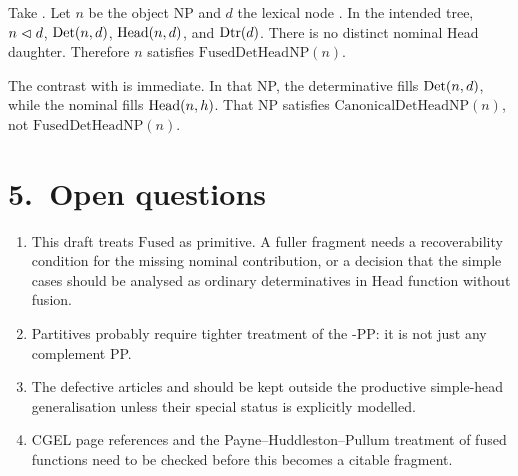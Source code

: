 \documentclass[11pt]{article}
\newcommand{\Dtr}{\Cat{Dtr}}
\newcommand{\Fused}{\mathrm{Fused}}
\newcommand{\FusedDetHeadNP}{\mathrm{FusedDetHeadNP}}
\newcommand{\CanonicalDetHeadNP}{\mathrm{CanonicalDetHeadNP}}
\begin{document}
Take . Let $n$ be the object NP and $d$ the lexical
node . In the intended tree, $n \mathrel{\lhd} d$, $\mathrm{Det}(n,d)$,
$\mathrm{Head}(n,d)$, and $\Dtr(d)$. There is no distinct nominal Head daughter.
Therefore $n$ satisfies $\FusedDetHeadNP(n)$.

The contrast with  is immediate. In that NP, the
determinative  fills $\mathrm{Det}(n,d)$, while the nominal
 fills $\mathrm{Head}(n,h)$. That NP satisfies
$\CanonicalDetHeadNP(n)$, not $\FusedDetHeadNP(n)$.

\section*{5.~Open questions}

\begin{enumerate}[label=(\alph*),leftmargin=2em,itemsep=0.25em]
  \item This draft treats $\Fused$ as primitive. A fuller fragment needs a
        recoverability condition for the missing nominal contribution, or a
        decision that the simple cases should be analysed as ordinary
        determinatives in Head function without fusion.
  \item Partitives probably require tighter treatment of the -PP:
        it is not just any complement PP.
  \item The defective articles  and  should be kept
        outside the productive simple-head generalisation unless their special
        status is explicitly modelled.
  \item CGEL page references and the Payne--Huddleston--Pullum treatment of
        fused functions need to be checked before this becomes a citable
        fragment.
\end{enumerate}
\end{document}
